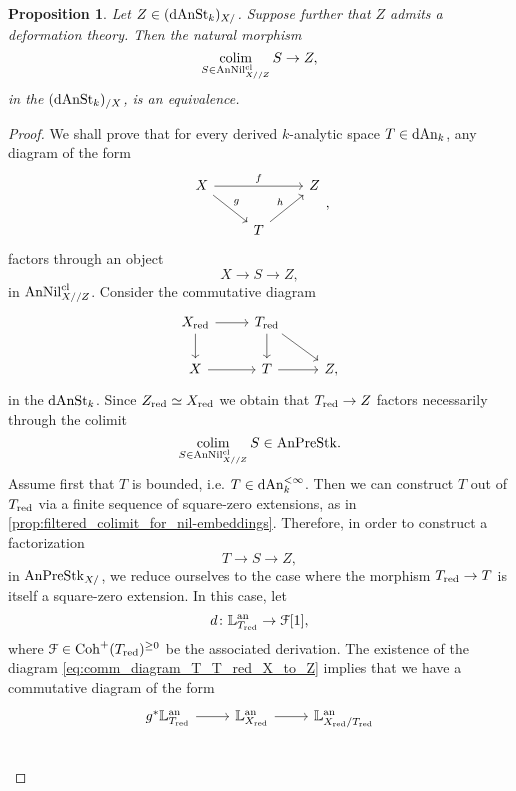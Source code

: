\documentclass[10pt,a4paper,reqno]{amsart} %
\theoremstyle{plain}
\newtheorem{prop}[thm]{Proposition}
\theoremstyle{definition}
\theoremstyle{remark}
\numberwithin{equation}{section}
\begin{document}
\begin{prop} \label{prop:stacks_under_X_with_deformation_theory_are_analytic_FMP}
    Let $Z \in (\mathrm{dAnSt}_k)_{X/ }$. Suppose further that $Z$ admits a deformation theory. Then the natural morphism
        \[
            \operatorname*{colim}_{S \in \mathrm{AnNil}_{X/ /Z}^{\mathrm{cl}}} S \to Z,  
        \]
    in the \infcat $(\mathrm{dAnSt}_k)_{/X}$, is an equivalence.
\end{prop}

\begin{proof}
    We shall prove that for every derived $k$-analytic space $T \in \mathrm{dAn}_k$, any diagram of the form
        \[
        \begin{tikzcd}
            X \ar{rr}{f} \ar{rd}{g} & & Z \\
                & T \ar{ru}{h} &  
        \end{tikzcd},
        \]
    factors through an object
        \[
            X \to S \to Z,  
        \]
    in $\mathrm{AnNil}_{X/ /Z}^{\mathrm{cl}}$. Consider the commutative diagram
        \begin{equation} \label{eq:comm_diagram_T_T_red_X_to_Z}
        \begin{tikzcd}
            X_{\red} \ar{r} \ar{d} & T_\red \ar{d} \ar{dr} & \\
            X \ar{r} & T \ar{r} & Z,
        \end{tikzcd}
        \end{equation}
    in the \infcat $\mathrm{dAnSt}_k$. Since $Z_{\mathrm{red}} \simeq X_{\mathrm{red}}$ we obtain that $T_{\mathrm{red}} \to Z$ factors necessarily through the colimit
        \[
            \operatorname*{colim}_{S \in \mathrm{AnNil}^{\mathrm{cl}}_{X/ /Z}} S \in \mathrm{AnPreStk}.  
        \]
    Assume first that $T$ is bounded, i.e. $T \in \mathrm{dAn}_k^{< \infty}$. Then we can construct $T$ out of $T_{\mathrm{red}}$ via a finite sequence of square-zero extensions,
    as in \cref{prop:filtered_colimit_for_nil-embeddings}. Therefore, in order to construct
    a factorization
        \[
            T \to S \to Z,  
        \]
    in $\mathrm{AnPreStk}_{X/}$, we reduce ourselves to the case where the morphism $T_{\mathrm{red}} \to T$ is itself a square-zero extension.
    In this case, let
        \[
            d \colon \mathbb L^\mathrm{an}_{T_{\mathrm{red}}} \to \mathcal F[1],  
        \]
    where $\mathcal F \in \mathrm{Coh}^+(T_{\mathrm{red}})^{\ge 0}$ be the associated derivation. The existence of the diagram \eqref{eq:comm_diagram_T_T_red_X_to_Z} implies that
    we have a commutative diagram of the form
        \[
        \begin{tikzcd}
                g^*\bbL\an_{T_\red} \ar{r} & \bbL\an_{X_\red} \ar{r} & \bbL\an_{X_\red/ T_\red} \\

\end{tikzcd}\]
\end{proof}
\end{document}
